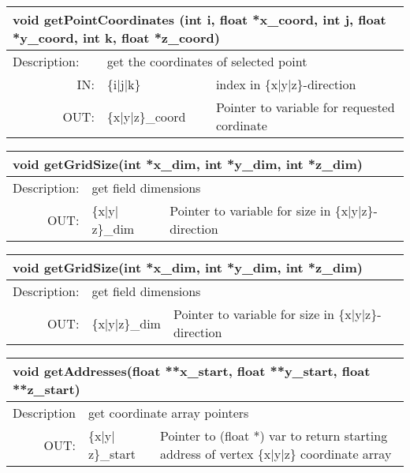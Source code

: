 \begin{htmlonly}
\begin{longtable}{|p{4cm}|p{2.5cm}|p{7cm}|}
\hline
\multicolumn{3}{|p{13.5cm}|}{\bf void getPointCoordinates \newline
(int i, float *x\_coord, int j,  float *y\_coord,  int k, float *z\_coord)}\\
\hline
{Description:}  
           & \multicolumn{2}{p{9.5cm}|}{get the coordinates of selected point} \\
\hline
\multicolumn{1}{|r|}{IN:} & \multicolumn{1}{p{3cm}|}{\{i|j|k\}} 
                          & \multicolumn{1}{p{5cm}|}{index in 
			     \{x|y|z\}-direction}\\
\hline
\multicolumn{1}{|r|}{OUT:} & \multicolumn{1}{p{3cm}|}{\{x|y|z\}\_coord} 
                          & \multicolumn{1}{p{5cm}|}{Pointer to variable
			  for requested cordinate}\endhead
\hline
\end{longtable}
\end{htmlonly}

\latexonly
\begin{longtable}{|p{4cm}|p{2.5cm}|p{7cm}|}
\hline
\multicolumn{3}{|p{13.5cm}|}{\bf void getGridSize(int *x\_dim, int *y\_dim, int *z\_dim)}\\
\hline
{Description:}  
           & \multicolumn{2}{p{9.5cm}|}{get field dimensions} \\
\hline
\multicolumn{1}{|r|}{OUT:} & \multicolumn{1}{p{3cm}|}{\{x$\mid$y$\mid$z\}\_dim} 
                          & \multicolumn{1}{p{5cm}|}{Pointer to variable 
			  for size in \{x$\mid$y$\mid$z\}-direction}\endhead
\hline
\end{longtable}
\endlatexonly

\begin{htmlonly}
\begin{longtable}{|p{4cm}|p{2.5cm}|p{7cm}|}
\hline
\multicolumn{3}{|p{13.5cm}|}{\bf void getGridSize(int *x\_dim, int *y\_dim, int *z\_dim)}\\
\hline
{Description:}  
           & \multicolumn{2}{p{9.5cm}|}{get field dimensions} \\
\hline
\multicolumn{1}{|r|}{OUT:} & \multicolumn{1}{p{3cm}|}{\{x|y|z\}\_dim} 
                          & \multicolumn{1}{p{5cm}|}{Pointer to variable 
			  for size in \{x|y|z\}-direction}\endhead
\hline
\end{longtable}
\end{htmlonly}

\latexonly
\begin{longtable}{|p{4cm}|p{2.5cm}|p{7cm}|}
\hline
\multicolumn{3}{|p{13.5cm}|}{\bf void getAddresses(float **x\_start, float **y\_start, 
                       float **z\_start)}\\
\hline
{Description} & 
\multicolumn{2}{p{9.5cm}|}{get coordinate array pointers} \\
\hline
\multicolumn{1}{|r|}{OUT:} & \multicolumn{1}{p{3cm}|}{\{x$\mid$y$\mid$z\}\_start} 
                          & \multicolumn{1}{p{5cm}|}{Pointer to (float *) var
			  to return starting address of vertex
			  \{x$\mid$y$\mid$z\} coordinate array}\endhead
\hline
\end{longtable} 
\endlatexonly

